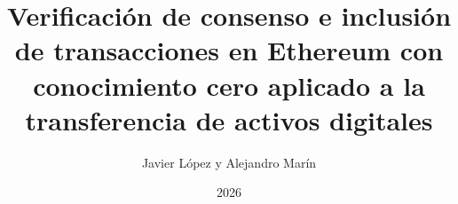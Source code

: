 \title{Verificación de consenso e inclusión de transacciones en Ethereum con conocimiento cero aplicado a la transferencia de activos digitales}
\author{Javier López y Alejandro Marín}
\date{2026}

\newcommand{\asesor}{PhD Marcos Villagra}
\newcommand{\institucion}{Facultad Politécnica, Universidad Nacional de Asunción}
